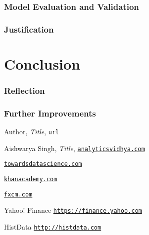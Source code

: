 \documentclass[a4paper,12pt]{article}
\begin{document}
\section{Model Evaluation and Validation}
\section{Justification}


\part{Conclusion}
\section{Reflection}
\section{Further Improvements}


\pagebreak
\tableofcontents
\begin{thebibliography}{15}
Author, \textit{Title}, \texttt{url}
	
Aishwarya Singh, \textit{Title},
\texttt{\href{https://www.analyticsvidhya.com/blog/2018/10/predicting-stock-price-machine-learningnd-deep-learning-techniques-python/}{analyticsvidhya.com}}

\texttt{\href{https://towardsdatascience.com/machine-learning-techniques-applied-to-stock-price-prediction-6c1994da8001}{towardsdatascience.com}}

\texttt{\href{https://www.khanacademy.org/economics-finance-domain/core-finance/stock-and-bonds}{khanacademy.com}}

\texttt{\href{https://www.fxcm.com/uk/insights/learn-forex-oscillators-and-momentum-indicators/}{fxcm.com}}

Yahoo! Finance
\texttt{\url{https://finance.yahoo.com}}

HistData
\texttt{\url{http://histdata.com}}
\end{thebibliography}
\end{document}
